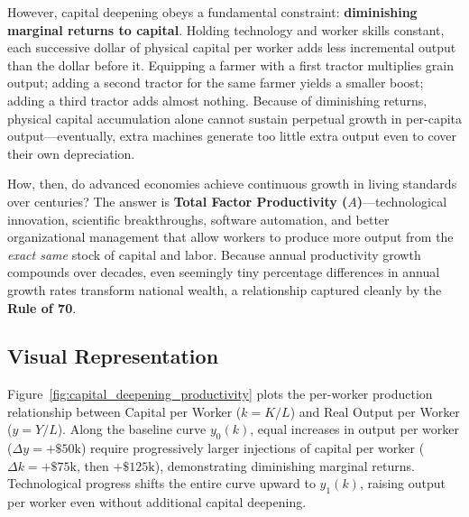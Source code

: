\documentclass[11pt,letterpaper]{article}
\begin{document}
However, capital deepening obeys a fundamental constraint: \textbf{diminishing marginal returns to capital}. Holding technology and worker skills constant, each successive dollar of physical capital per worker adds less incremental output than the dollar before it. Equipping a farmer with a first tractor multiplies grain output; adding a second tractor for the same farmer yields a smaller boost; adding a third tractor adds almost nothing. Because of diminishing returns, physical capital accumulation alone cannot sustain perpetual growth in per-capita output—eventually, extra machines generate too little extra output even to cover their own depreciation.

How, then, do advanced economies achieve continuous growth in living standards over centuries? The answer is \textbf{Total Factor Productivity ($A$)}—technological innovation, scientific breakthroughs, software automation, and better organizational management that allow workers to produce more output from the \emph{exact same} stock of capital and labor. Because annual productivity growth compounds over decades, even seemingly tiny percentage differences in annual growth rates transform national wealth, a relationship captured cleanly by the \textbf{Rule of 70}.

\subsection*{Visual Representation}
Figure~\ref{fig:capital_deepening_productivity} plots the per-worker production relationship between Capital per Worker ($k = K/L$) and Real Output per Worker ($y = Y/L$). Along the baseline curve $y_0(k)$, equal increases in output per worker ($\Delta y = +\$50\text{k}$) require progressively larger injections of capital per worker ($\Delta k = +\$75\text{k}$, then $+\$125\text{k}$), demonstrating diminishing marginal returns. Technological progress shifts the entire curve upward to $y_1(k)$, raising output per worker even without additional capital deepening.
\end{document}
